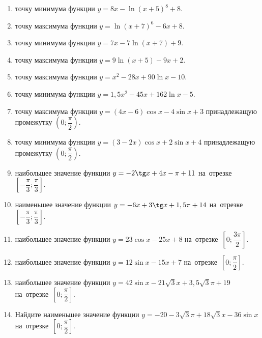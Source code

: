 \documentclass[a4paper,10pt]{article}
\begin{document}
\begin{enumerate}
\item {} точку минимума функции $y=8x-\ln\left(x+5\right)^{8}+8$.

\item {} точку максимума функции $y=\ln\left(x+7\right)^{6}-6x+8$.

\item {} точку минимума функции $y=7x-7\ln\left(x+7\right)+9$.

\item {} точку максимума функции $y=9\ln\left(x+5\right)-9x+2$.

\item {} точку максимума функции $y=x^2-28x+90\ln x -10$.

\item {} точку минимума функции $y=1,5x^2-45x+162\ln x -5$.

\item {} точку максимума функции $y=\left(4x-6\right)\cos x -4\sin x+3$
принадлежащую промежутку $\left(0;\dfrac{\pi}{2}\right)$.

\item {} точку минимума функции $y=\left(3-2x\right)\cos x +2\sin x+4$
принадлежащую промежутку $\left(0;\dfrac{\pi}{2}\right)$.

\item {} наибольшее значение функции $y=-2\tg x +4x-\pi +11$ на~отрезке~$\left[-\dfrac{\pi}{3};\dfrac{\pi}{3}\right]$.

\item {} наименьшее значение функции $y=-6x +3\tg x+1,5\pi+14$ на~отрезке~$\left[-\dfrac{\pi}{3};\dfrac{\pi}{3}\right]$.

\item {} наибольшее значение функции $y=23\cos x-25x+8$ на~отрезке~$\left[0;\dfrac{3\pi}{2}\right]$.

\item {} наибольшее значение функции $y=12\sin x-15x+7$ на~отрезке~$\left[0;\dfrac{\pi}{2}\right]$.

\item {} наибольшее значение функции $y=42\sin x-21\sqrt{3}x+3,5\sqrt{3}\pi +19$ на~отрезке~$\left[0;\dfrac{\pi}{2}\right]$.

\item Найдите наименьшее значение функции $y=-20-3\sqrt{3}\pi+18\sqrt{3}x-36\sin x$ на~отрезке~$\left[0;\dfrac{\pi}{2}\right]$.


\end{enumerate}
\end{document}
